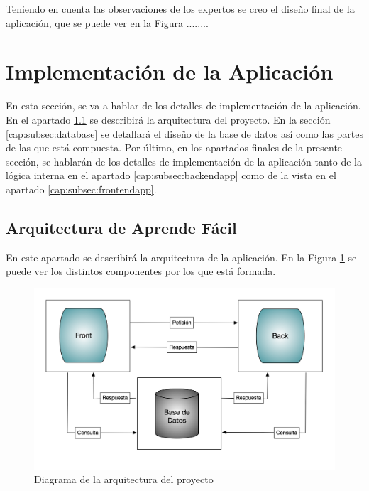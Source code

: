 Teniendo en cuenta las observaciones de los expertos se creo el diseño final de la aplicación, que se puede ver en la Figura ........





\section{Implementación de la Aplicación}
\label{cap:sec:implementacionApp}

En esta sección, se va a hablar de los detalles de implementación de la aplicación. En el apartado \ref{cap:subsec:arquitectura} se describirá la arquitectura del proyecto. En la sección \ref{cap:subsec:database} se detallará el diseño de la base de datos así como las partes de las que está compuesta. Por último, en los apartados finales de la presente sección, se hablarán de los detalles de implementación de la aplicación tanto de la lógica interna en el apartado \ref{cap:subsec:backendapp} como de la vista en el apartado \ref{cap:subsec:frontendapp}.


\subsection{Arquitectura de Aprende Fácil}
\label{cap:subsec:arquitectura}
En este apartado se describirá la arquitectura de la aplicación. En la Figura \ref{fig:diagrama_arquitectura} se puede ver los distintos componentes por los que está formada.

\begin{figure}[!h]
	\includegraphics[width=.9\textwidth]{Imagenes/Bitmap/Capitulo4/DiagramaArquitectura.png}
	\centering
	\caption{Diagrama de la arquitectura del proyecto}
	\label{fig:diagrama_arquitectura}
\end{figure}

